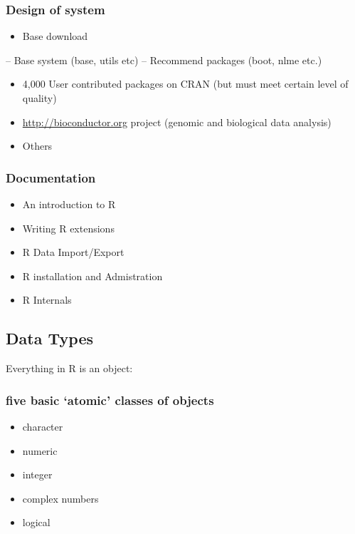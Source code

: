 \documentclass[11pt]{article}
\begin{document}
\subsubsection{Design of system}
\label{sec-1-3-4}

\begin{itemize}
\item Base download
\end{itemize}
-- Base system (base, utils etc)
-- Recommend packages (boot, nlme etc.)

\begin{itemize}
\item 4,000 User contributed packages on CRAN (but must meet certain level
  of quality)
\item \href{http://bioconductor.org}{http://bioconductor.org} project (genomic and biological data
  analysis)
\item Others
\end{itemize}
\subsubsection{Documentation}
\label{sec-1-3-5}


\begin{itemize}
\item An introduction to R
\item Writing R extensions
\item R Data Import/Export
\item R installation and Admistration
\item R Internals
\end{itemize}
\subsection{Data Types}
\label{sec-1-4}

Everything in R is an object:
\subsubsection{five basic `atomic' classes of objects}
\label{sec-1-4-1}

\begin{itemize}
\item character
\item numeric
\item integer
\item complex numbers
\item logical
\end{itemize}
\end{document}
